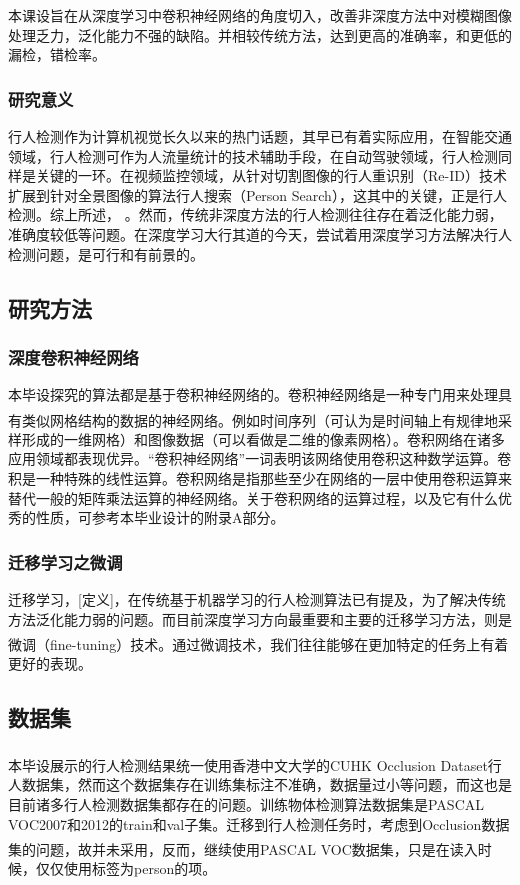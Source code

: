 \documentclass[12pt,a4paper,titlepage]{article}
\newcommand{\upcite}[1]{\textsuperscript{\textsuperscript{\cite{#1}}}}  %
\begin{document}
本课设旨在从深度学习中卷积神经网络的角度切入，改善非深度方法中对模糊图像处理乏力，泛化能力不强的缺陷。并相较传统方法，达到更高的准确率，和更低的漏检，错检率。 
\subsubsection{研究意义}
行人检测作为计算机视觉长久以来的热门话题，其早已有着实际应用，在智能交通领域，行人检测可作为人流量统计的技术辅助手段，在自动驾驶领域，行人检测同样是关键的一环。在视频监控领域，从针对切割图像的行人重识别（Re-ID）技术扩展到针对全景图像的算法行人搜索（Person Search），这其中的关键，正是行人检测。综上所述， 。然而，传统非深度方法的行人检测往往存在着泛化能力弱，准确度较低等问题。在深度学习大行其道的今天，尝试着用深度学习方法解决行人检测问题，是可行和有前景的。

\subsection{研究方法}
\subsubsection{深度卷积神经网络}
本毕设探究的算法都是基于卷积神经网络的。卷积神经网络是一种专门用来处理具有类似网格结构的数据的神经网络\upcite{Goodfellow-et-al-2016}。例如时间序列（可认为是时间轴上有规律地采样形成的一维网格）和图像数据（可以看做是二维的像素网格）。卷积网络在诸多应用领域都表现优异。“卷积神经网络”一词表明该网络使用卷积这种数学运算。卷积是一种特殊的线性运算。卷积网络是指那些至少在网络的一层中使用卷积运算来替代一般的矩阵乘法运算的神经网络。关于卷积网络的运算过程，以及它有什么优秀的性质，可参考本毕业设计的附录A部分。

\subsubsection{迁移学习之微调}
迁移学习，[定义]，在传统基于机器学习的行人检测算法已有提及，为了解决传统方法泛化能力弱的问题。而目前深度学习方向最重要和主要的迁移学习方法，则是微调（fine-tuning）技术\upcite{yosinski2014transferable}。通过微调技术，我们往往能够在更加特定的任务上有着更好的表现。

\subsection{数据集}
本毕设展示的行人检测结果统一使用香港中文大学的CUHK Occlusion Dataset\upcite{ouyang2012discriminative}行人数据集，然而这个数据集存在训练集标注不准确，数据量过小等问题，而这也是目前诸多行人检测数据集都存在的问题。训练物体检测算法数据集是PASCAL VOC2007和2012的train和val子集。迁移到行人检测任务时，考虑到Occlusion数据集的问题，故并未采用，反而，继续使用PASCAL VOC\upcite{pascal-voc-2007}数据集，只是在读入时候，仅仅使用标签为person的项。
\end{document}
